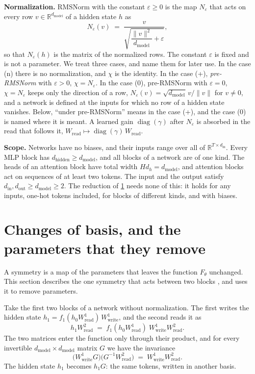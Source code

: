 \documentclass[10pt]{article}
\theoremstyle{definition}
\theoremstyle{remark}
\newcommand{\R}{\mathbb{R}}
\newcommand{\Wread}{W_{\mathrm{read}}}
\newcommand{\Wwrite}{W_{\mathrm{write}}}
\newcommand{\dm}{d_{\mathrm{model}}}
\newcommand{\dhid}{d_{\mathrm{hidden}}}
\newcommand{\norm}[1]{\lVert #1\rVert}
\newcommand{\para}[1]{\smallskip\noindent\textbf{#1}\hspace{0.5em}}
\begin{document}
\para{Normalization.} RMSNorm with the constant $\varepsilon \ge 0$ is the map $N_\varepsilon$ that acts on every row $v \in \R^{\dm}$ of a hidden state $h$ as
\[
N_\varepsilon(v) \;=\; \frac{v}{\sqrt{\dfrac{\norm{v}^2}{\dm} + \varepsilon}} ,
\]
so that $N_\varepsilon(h)$ is the matrix of the normalized rows. The constant $\varepsilon$ is fixed and is not a parameter. We treat three cases, and name them for later use. In the case (n) there is no normalization, and $\chi$ is the identity. In the case (+), \emph{pre-RMSNorm} with $\varepsilon > 0$, $\chi = N_\varepsilon$. In the case (0), pre-RMSNorm with $\varepsilon = 0$, $\chi = N_\varepsilon$ keeps only the direction of a row, $N_\varepsilon(v) = \sqrt{\dm}\,v/\norm{v}$ for $v \neq 0$, and a network is defined at the inputs for which no row of a hidden state vanishes. Below, ``under pre-RMSNorm'' means in the case (+), and the case (0) is named where it is meant. A learned gain $\operatorname{diag}(\gamma)$ after $N_\varepsilon$ is absorbed in the read that follows it, $\Wread \mapsto \operatorname{diag}(\gamma)\,\Wread$.

\para{Scope.} Networks have no biases, and their inputs range over all of $\R^{T\times d_{\mathrm{in}}}$. Every MLP block has $\dhid \ge \dm$, and all blocks of a network are of one kind. The heads of an attention block have total width $Hd_h = \dm$, and attention blocks act on sequences of at least two tokens. The input and the output satisfy $d_{\mathrm{in}}, d_{\mathrm{out}} \ge \dm \ge 2$. The reduction of \cref{sec:reduce} needs none of this: it holds for any inputs, one-hot tokens included, for blocks of different kinds, and with biases.

\section{Changes of basis, and the parameters that they remove}\label{sec:reduce}

A symmetry is a map of the parameters that leaves the function $F_\theta$ unchanged. This section describes the one symmetry that acts between two blocks \citep{godfrey2022symmetries,zhao2023symmetries}, and uses it to remove parameters.

Take the first two blocks of a network without normalization. The first writes the hidden state $h_1 = f_1(h_0\Wread^{1})\,\Wwrite^{1}$, and the second reads it as
\begin{equation}\label{eq:product}
h_1\Wread^{2} \;=\; f_1(h_0\Wread^{1})\;\Wwrite^{1}\Wread^{2}.
\end{equation}
The two matrices enter the function only through their product, and for every invertible $\dm\times\dm$ matrix $G$ we have the invariance
\begin{equation}\label{eq:invariance}
\big(\Wwrite^{1}G\big)\big(G^{-1}\Wread^{2}\big) \;=\; \Wwrite^{1}\Wread^{2}.
\end{equation}
The hidden state $h_1$ becomes $h_1G$: the same tokens, written in another basis.
\end{document}
